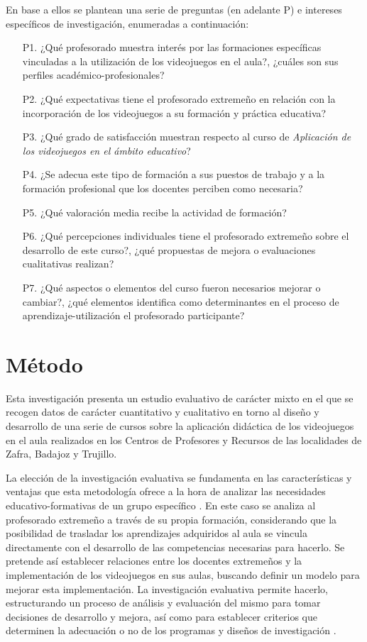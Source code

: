\documentclass[spanish]{textolivre}
\begin{document}
En base a ellos se plantean una serie de preguntas (en adelante P) e intereses específicos de investigación, enumeradas a continuación:

\begin{enumerate}
    \item[P1.] ¿Qué profesorado muestra interés por las formaciones específicas vinculadas a la utilización de los videojuegos en el aula?, ¿cuáles son sus perfiles académico-profesionales?
    \item[P2.] ¿Qué expectativas tiene el profesorado extremeño en relación con la incorporación de los videojuegos a su formación y práctica educativa?
    \item[P3.] ¿Qué grado de satisfacción muestran respecto al curso de \textit{Aplicación de los videojuegos en el ámbito educativo}?
    \item[P4.] ¿Se adecua este tipo de formación a sus puestos de trabajo y a la formación profesional que los docentes perciben como necesaria?
    \item[P5.] ¿Qué valoración media recibe la actividad de formación?
    \item[P6.] ¿Qué percepciones individuales tiene el profesorado extremeño sobre el desarrollo de este curso?, ¿qué propuestas de mejora o evaluaciones cualitativas realizan?
    \item[P7.] ¿Qué aspectos o elementos del curso fueron necesarios mejorar o cambiar?, ¿qué elementos identifica como determinantes en el proceso de aprendizaje-utilización el profesorado participante?
\end{enumerate}

\section{Método}\label{sec-modelo}
Esta investigación presenta un estudio evaluativo de carácter mixto en el que se recogen datos de carácter cuantitativo y cualitativo en torno al diseño y desarrollo de una serie de cursos sobre la aplicación didáctica de los videojuegos en el aula realizados en los Centros de Profesores y Recursos de las localidades de Zafra, Badajoz y Trujillo.

La elección de la investigación evaluativa se fundamenta en las características y ventajas que esta metodología ofrece a la hora de analizar las necesidades educativo-formativas de un grupo específico \cite{bausela2004metodologia}. En este caso se analiza al profesorado extremeño a través de su propia formación, considerando que la posibilidad de trasladar los aprendizajes adquiridos al aula se vincula directamente con el desarrollo de las competencias necesarias para hacerlo. Se pretende así establecer relaciones entre los docentes extremeños y la implementación de los videojuegos en sus aulas, buscando definir un modelo para mejorar esta implementación. La investigación evaluativa permite hacerlo, estructurando un proceso de análisis y evaluación del mismo para tomar decisiones de desarrollo y mejora, así como para establecer criterios que determinen la adecuación o no de los programas y diseños de investigación \cite{escudero2016investigacion}.
\end{document}
